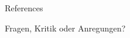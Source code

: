 \documentclass{beamer}
\begin{document}

\appendix

\begin{frame}[allowframebreaks]{References}
	
	\nocite{*}
	
\end{frame}

\begin{frame}[focus]

	Fragen, Kritik oder Anregungen?
	
\end{frame}

\end{document}
